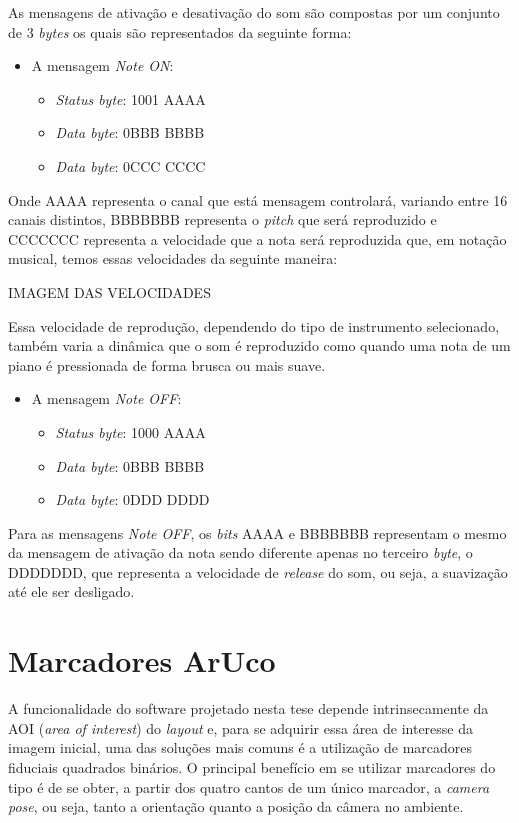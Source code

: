 \documentclass[12pt]{report}
\begin{document}
As mensagens de ativação e desativação do som são compostas por um conjunto de 3 {\it bytes} os quais são representados da seguinte forma:

\begin{itemize}
  \item A mensagem {\it Note ON}:
  \begin{itemize}
    \item {\it Status byte}: 1001 AAAA
    \item {\it Data byte}: 0BBB BBBB
    \item {\it Data byte}: 0CCC CCCC
  \end{itemize}
\end{itemize}

Onde AAAA representa o canal que está mensagem controlará, variando entre 16 canais distintos, BBBBBBB representa o {\it pitch} que será reproduzido e CCCCCCC representa a velocidade que a nota será reproduzida que, em notação musical, temos essas velocidades da seguinte maneira:

IMAGEM DAS VELOCIDADES

Essa velocidade de reprodução, dependendo do tipo de instrumento selecionado, também varia a dinâmica que o som é reproduzido como quando uma nota de um piano é pressionada de forma brusca ou mais suave.

\begin{itemize}
  \item A mensagem {\it Note OFF}:
  \begin{itemize}
    \item {\it Status byte}: 1000 AAAA
    \item {\it Data byte}: 0BBB BBBB
    \item {\it Data byte}: 0DDD DDDD
  \end{itemize}
\end{itemize}

Para as mensagens {\it Note OFF}, os {\it bits} AAAA e BBBBBBB representam o mesmo da mensagem de ativação da nota sendo diferente apenas no terceiro {\it byte}, o DDDDDDD, que representa a velocidade de {\it release} do som, ou seja, a suavização até ele ser desligado.

\chapter{Marcadores ArUco}
\label{cha:fund-teor}

A funcionalidade do software projetado nesta tese depende intrinsecamente da AOI ({\it area of interest}) do {\it layout} e, para se adquirir essa área de interesse da imagem inicial, uma das soluções mais comuns é a utilização de marcadores fiduciais quadrados binários. O principal benefício em se utilizar marcadores do tipo é de se obter, a partir dos quatro cantos de um único marcador, a {\it camera pose}, ou seja, tanto a orientação quanto a posição da câmera no ambiente.
\end{document}
